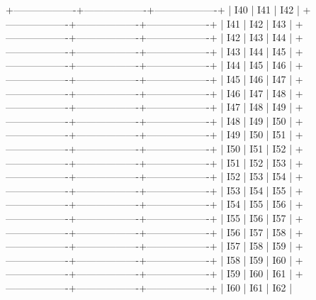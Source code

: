 +-------------------+-------------------+-------------------+
|       I40          |       I41          |       I42         |
+-------------------+-------------------+-------------------+
|       I41          |       I42          |       I43         |
+-------------------+-------------------+-------------------+
|       I42          |       I43          |       I44         |
+-------------------+-------------------+-------------------+
|       I43          |       I44          |       I45         |
+-------------------+-------------------+-------------------+
|       I44          |       I45          |       I46         |
+-------------------+-------------------+-------------------+
|       I45          |       I46          |       I47         |
+-------------------+-------------------+-------------------+
|       I46          |       I47          |       I48         |
+-------------------+-------------------+-------------------+
|       I47          |       I48          |       I49         |
+-------------------+-------------------+-------------------+
|       I48          |       I49          |       I50         |
+-------------------+-------------------+-------------------+
|       I49          |       I50          |       I51         |
+-------------------+-------------------+-------------------+
|       I50          |       I51          |       I52         |
+-------------------+-------------------+-------------------+
|       I51          |       I52          |       I53         |
+-------------------+-------------------+-------------------+
|       I52          |       I53          |       I54         |
+-------------------+-------------------+-------------------+
|       I53          |       I54          |       I55         |
+-------------------+-------------------+-------------------+
|       I54          |       I55          |       I56         |
+-------------------+-------------------+-------------------+
|       I55          |       I56          |       I57         |
+-------------------+-------------------+-------------------+
|       I56          |       I57          |       I58         |
+-------------------+-------------------+-------------------+
|       I57          |       I58          |       I59         |
+-------------------+-------------------+-------------------+
|       I58          |       I59          |       I60         |
+-------------------+-------------------+-------------------+
|       I59          |       I60          |       I61         |
+-------------------+-------------------+-------------------+
|       I60          |       I61          |       I62         |
